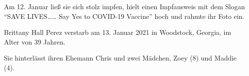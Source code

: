 Am 12. Januar ließ sie sich stolz impfen, hielt einen Impfausweis mit dem Slogan
“SAVE LIVES…… Say Yes to COVID-19 Vaccine” hoch und rahmte ihr Foto ein.

Brittany Hall Perez verstarb am 13. Januar 2021 in Woodstock, Georgia, im Alter
von 39 Jahren.

Sie hinterlässt ihren Ehemann Chris und zwei Mädchen, Zoey (8) und Maddie (4).
